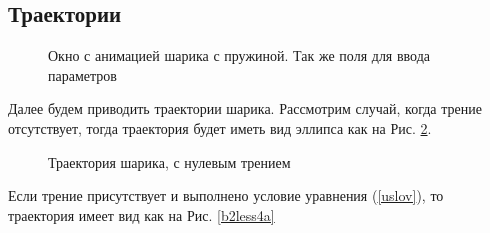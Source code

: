 \documentclass[a4paper,12pt,titlepage]{article}
\theoremstyle{definition}
\theoremstyle{theorem}
\theoremstyle{definition}
\begin{document}
\subsection{Траектории}
\begin{figure}[h!!!]

    \noindent{}
    \caption{Окно с анимацией шарика с пружиной. Так же поля для ввода параметров}
    \label{prog}
\end{figure}
Далее будем приводить траектории шарика. 
Рассмотрим случай, когда трение отсутствует, тогда
траектория будет иметь вид эллипса как на Рис. \ref*{b0}.
\begin{figure}[h!!!]
    \noindent{}
    \caption{Траектория шарика, с нулевым трением}
    \label{b0}
\end{figure}

Если трение присутствует и выполнено условие уравнения (\ref*{uslov}), 
то траектория имеет
вид как на Рис. \ref*{b2less4a}
\end{document}
